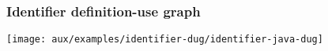 \begin{frame}[hasprev=false, hasnext=false, c]
\frametitle{Identifier definition-use graph}
\label{example:identifier-dug}

\texttt{[image: aux/examples/identifier-dug/identifier-java-dug]}
\end{frame}

